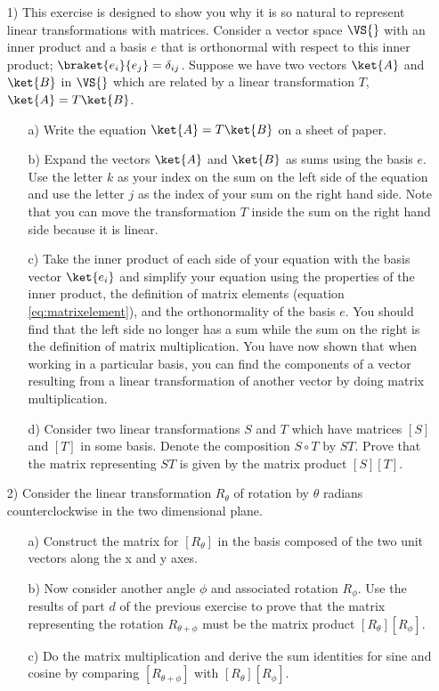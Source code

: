 \begin{itemize}
  \item[1)] This exercise is designed to show you why it is so natural to represent linear transformations with matrices.  Consider a vector space $\VS{}$ with an inner product and a basis $e$ that is orthonormal with respect to this inner product; $\braket{e_i}{e_j}=\delta_{ij}$.  Suppose we have two vectors $\ket{A}$ and $\ket{B}$ in $\VS{}$ which are related by a linear transformation $T$, \mbox{$\ket{A} = T\ket{B}$.}
  \begin{itemize}
    \item[a)] Write the equation $\ket{A} = T\ket{B}$ on a sheet of paper.
    \item[b)] Expand the vectors $\ket{A}$ and $\ket{B}$ as sums using the basis $e$.
      Use the letter $k$ as your index on the sum on the left side of the equation and use the letter $j$ as the index of your sum on the right hand side.
      Note that you can move the transformation $T$ inside the sum on the right hand side because it is linear.
    \item[c)] Take the inner product of each side of your equation with the basis vector $\ket{e_i}$ and simplify your equation using the properties of the inner product, the definition of matrix elements (equation \ref{eq:matrixelement}), and the orthonormality of the basis $e$.
      You should find that the left side no longer has a sum while the sum on the right is the definition of matrix multiplication.
      You have now shown that when working in a particular basis, you can find the components of a vector resulting from a linear transformation of another vector by doing matrix multiplication.
    \item[d)] Consider two linear transformations $S$ and $T$ which have matrices $[S]$ and $[T]$ in some basis.
      Denote the composition $S \circ T$ by $ST$.
      Prove that the matrix representing $ST$ is given by the matrix product $[S][T]$.
  \end{itemize}
  \item[2)] Consider the linear transformation $R_{\theta}$ of rotation by $\theta$ radians counterclockwise in the two dimensional plane.
    \begin{itemize}
      \item[a)] Construct the matrix for $[R_\theta]$ in the basis composed of the two unit vectors along the x and y axes.
      \item[b)] Now consider another angle $\phi$ and associated rotation $R_\phi$.
        Use the results of part $d$ of the previous exercise to prove that the matrix representing the rotation $R_{\theta + \phi}$ must be the matrix product $[R_\theta][R_\phi]$.
      \item[c)] Do the matrix multiplication and derive the sum identities for sine and cosine by comparing $[R_{\theta + \phi}]$ with $[R_\theta][R_\phi]$.
    \end{itemize}
\end{itemize}

